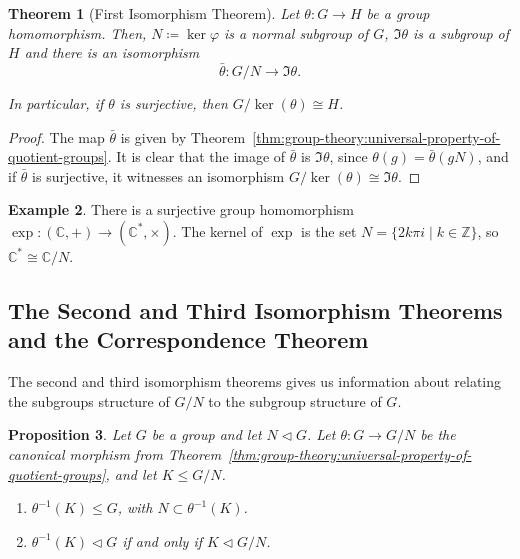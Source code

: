 \documentclass[12pt]{report}
\newcommand{\Z}{\mathbb{Z}}
\newcommand{\C}{\mathbb{C}}
\newcommand{\iso}{\cong}
\renewcommand{\phi}{\varphi}
\newtheorem{theorem}{Theorem}[section] %
\newtheorem{proposition}[theorem]{Proposition}
\theoremstyle{definition}
\newtheorem{example}[theorem]{Example}
\begin{document}
\begin{theorem}[First Isomorphism Theorem]
  \label{thm:group-theory:first-isomorphism-theorem}
  Let \(\theta : G \to H\) be a group homomorphism.
  Then, \(N \coloneqq \ker\phi\) is a normal subgroup of \(G\), \(\Im \theta\) is a subgroup of \(H\) and there is an isomorphism
  \[\bar \theta : G / N \to \Im \theta.\]

  In particular, if \(\theta\) is surjective, then \(G / \ker(\theta) \iso H\).
\end{theorem}

\begin{proof}
  The map \(\bar \theta\) is given by Theorem~\ref{thm:group-theory:universal-property-of-quotient-groups}.
  It is clear that the image of \(\bar\theta\) is \(\Im \theta\), since \(\theta(g) = \bar \theta(gN)\), and if \(\bar\theta\) is surjective, it witnesses an isomorphism \(G/\ker(\theta) \iso \Im \theta\).
\end{proof}

\begin{example}
  There is a surjective group homomorphism \(\exp : (\C, +) \to (\C^{*}, \times)\).
  The kernel of \(\exp\) is the set \(N = \{2k\pi i \mid k \in \Z\}\), so \(\C^{*} \iso \C/N\).
\end{example}


\subsection{The Second and Third Isomorphism Theorems and the Correspondence Theorem}\label{sec:second-and-third-isomorphism-theorems-and-correspondence-theorem}

The second and third isomorphism theorems gives us information about relating the subgroups structure of \(G /N\) to the subgroup structure of \(G\).

\begin{proposition}\label{prp:group-theory:preimage-of-subgroups-of-G/N}
  Let \(G\) be a group and let \(N \triangleleft G\).
  Let \(\theta: G \to G/N\) be the canonical morphism from Theorem~\ref{thm:group-theory:universal-property-of-quotient-groups}, and let \(K \leq G / N\).

  \begin{enumerate}
  \item
    \(\theta^{-1}(K) \leq G\), with \(N \subset \theta^{-1}(K)\).
  \item
    \(\theta^{-1}(K) \triangleleft G\) if and only if \(K \triangleleft G/N\).
  \end{enumerate}
\end{proposition}
\end{document}
